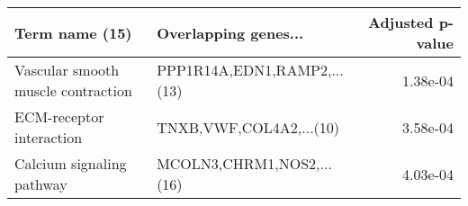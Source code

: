 \begin{tabular}{llr}
\toprule
                    Term name (15) &        Overlapping genes... &  Adjusted p-value \\
\midrule
Vascular smooth muscle contraction & PPP1R14A,EDN1,RAMP2,...(13) &          1.38e-04 \\
          ECM-receptor interaction &     TNXB,VWF,COL4A2,...(10) &          3.58e-04 \\
         Calcium signaling pathway &   MCOLN3,CHRM1,NOS2,...(16) &          4.03e-04 \\
\bottomrule
\end{tabular}
